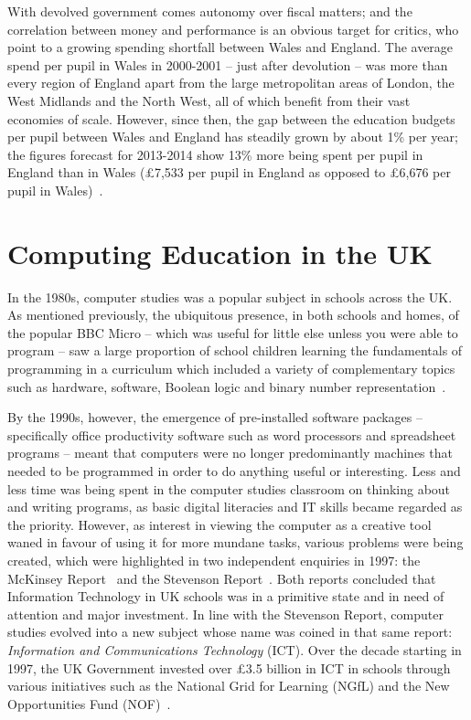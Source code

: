 \documentclass{sig-alternate}
\begin{document}
With devolved government comes autonomy over fiscal matters; and the
correlation between money and performance is an obvious target for
critics, who point to a growing spending shortfall between Wales and
England.  The average spend per pupil in Wales in 2000-2001 -- just
after devolution -- was more than every region of England apart from
the large metropolitan areas of London, the West Midlands and the
North West, all of which benefit from their vast economies of scale.
However, since then, the gap between the education budgets per pupil
between Wales and England has steadily grown by about 1\% per year;
the figures forecast for 2013-2014 show 13\% more being spent per
pupil in England than in Wales (\pounds7,533 per pupil in England as
opposed to \pounds6,676 per pupil in Wales)~\cite{Evans:2015}.

\section{Computing Education in the UK}\label{compedu}

In the 1980s, computer studies was a popular subject in schools across
the UK. As mentioned previously, the ubiquitous presence, in both
schools and homes, of the popular BBC Micro -- which was useful for
little else unless you were able to program -- saw a large proportion
of school children learning the fundamentals of programming in a
curriculum which included a variety of complementary topics such as
hardware, software, Boolean logic and binary number
representation~\cite{Doyle:1988}.

By the 1990s, however, the emergence of pre-installed software
packages -- specifically office productivity software such as word
processors and spreadsheet programs -- meant that computers were no
longer predominantly machines that needed to be programmed in order to
do anything useful or interesting.  Less and less time was being spent
in the computer studies classroom on thinking about and writing
programs, as basic digital literacies and IT skills became regarded as
the priority. However, as interest in viewing the computer as a
creative tool waned in favour of using it for more mundane tasks,
various problems were being created, which were highlighted in two
independent enquiries in 1997: the McKinsey
Report~\cite{McKinsey:1997} and the Stevenson
Report~\cite{Stevenson:1997}.  Both reports concluded that Information
Technology in UK schools was in a primitive state and in need of
attention and major investment. In line with the Stevenson Report,
computer studies evolved into a new subject whose name was coined in
that same report: {\emph{Information and Communications Technology}}
(ICT).  Over the decade starting in 1997, the UK Government invested
over \pounds3.5 billion in ICT in schools through various initiatives
such as the National Grid for Learning (NGfL) and the New
Opportunities Fund (NOF)~\cite{Doughty:2006}.
\end{document}
